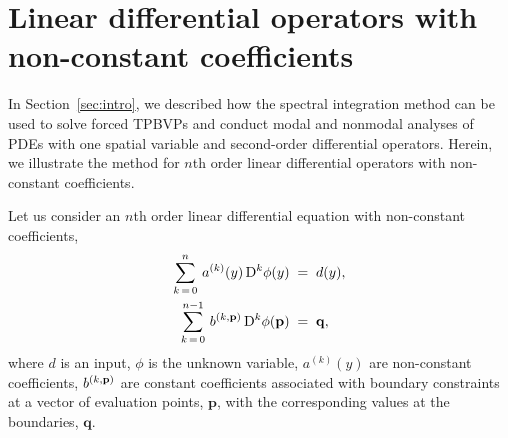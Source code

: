 \documentclass[%
secnumarabic,%
 amssymb, amsmath,%
 aps,prf,superscriptaddress,longbibliography
frontmatterverbose,
]{revtex4-2}
\begin{document}
	\vspace*{-4ex}
\section{Linear differential operators with non-constant coefficients}
	\label{sec.main}

	\vspace*{-2ex}
In Section~\ref{sec:intro}, we described how the spectral integration method can be used to solve forced TPBVPs and conduct modal and nonmodal analyses of PDEs with one spatial variable and second-order differential operators. Herein, we illustrate the method for $n$th order linear differential operators with non-constant coefficients. 

Let us consider an $n$th order linear differential equation with non-constant coefficients,
\begin{subequations}\label{eq1:1}
\begin{align}
    \sum_{k \, = \, 0}^{n}\, a^{(k)}(y)\, \mathrm D^k \phi (y) \;&=\; d(y),\label{eq:1a}\\
    \sum_{k \, = \, 0}^{n-1}\,b^{(k,\mathbf p)} \, \mathrm D^k \phi (\mathbf p) \;&=\; \mathbf q,\label{eq:1b}
\end{align}
\end{subequations}
where $d$ is an input, $\phi$ is the unknown variable, $a^{(k)} (y)$ are non-constant coefficients, $b^{(k,\mathbf{p})}$ are constant coefficients associated with boundary constraints at a vector of evaluation points, $\mathbf p$, with the corresponding values at the boundaries, $\mathbf q$. 
\end{document}
